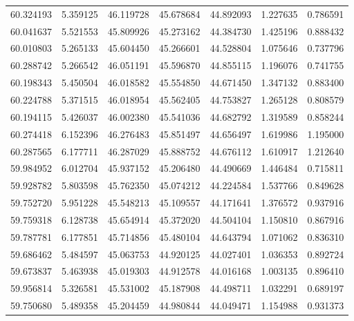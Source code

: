 \begin{tabular}{rrrrrrr}
 60.324193 &   5.359125 &         46.119728 &         45.678684 &         44.892093 &  1.227635 &  0.786591 \\
 60.041637 &   5.521553 &         45.809926 &         45.273162 &         44.384730 &  1.425196 &  0.888432 \\
 60.010803 &   5.265133 &         45.604450 &         45.266601 &         44.528804 &  1.075646 &  0.737796 \\
 60.288742 &   5.266542 &         46.051191 &         45.596870 &         44.855115 &  1.196076 &  0.741755 \\
 60.198343 &   5.450504 &         46.018582 &         45.554850 &         44.671450 &  1.347132 &  0.883400 \\
 60.224788 &   5.371515 &         46.018954 &         45.562405 &         44.753827 &  1.265128 &  0.808579 \\
 60.194115 &   5.426037 &         46.002380 &         45.541036 &         44.682792 &  1.319589 &  0.858244 \\
 60.274418 &   6.152396 &         46.276483 &         45.851497 &         44.656497 &  1.619986 &  1.195000 \\
 60.287565 &   6.177711 &         46.287029 &         45.888752 &         44.676112 &  1.610917 &  1.212640 \\
 59.984952 &   6.012704 &         45.937152 &         45.206480 &         44.490669 &  1.446484 &  0.715811 \\
 59.928782 &   5.803598 &         45.762350 &         45.074212 &         44.224584 &  1.537766 &  0.849628 \\
 59.752720 &   5.951228 &         45.548213 &         45.109557 &         44.171641 &  1.376572 &  0.937916 \\
 59.759318 &   6.128738 &         45.654914 &         45.372020 &         44.504104 &  1.150810 &  0.867916 \\
 59.787781 &   6.177851 &         45.714856 &         45.480104 &         44.643794 &  1.071062 &  0.836310 \\
 59.686462 &   5.484597 &         45.063753 &         44.920125 &         44.027401 &  1.036353 &  0.892724 \\
 59.673837 &   5.463938 &         45.019303 &         44.912578 &         44.016168 &  1.003135 &  0.896410 \\
 59.956814 &   5.326581 &         45.531002 &         45.187908 &         44.498711 &  1.032291 &  0.689197 \\
 59.750680 &   5.489358 &         45.204459 &         44.980844 &         44.049471 &  1.154988 &  0.931373 \\

\end{tabular}
